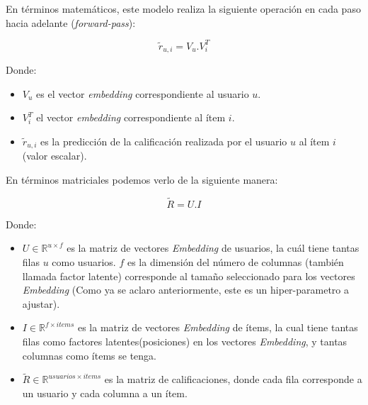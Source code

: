 \documentclass[11pt,a4paper,twoside]{thesis}
\begin{document}
\clearpage

En términos matemáticos, este modelo realiza la siguiente operación en cada
paso hacia adelante (\textit{forward-pass}):

\begin{equation}
	\tilde{r}_{u, i} = V_u . V_i^{T}
\end{equation}
\begin{description}
	\item[Donde:]
\end{description}
\begin{itemize}
	\item $V_u$ es el vector \textit{embedding} correspondiente al usuario $u$.
	\item $V_i^{T}$ el vector \textit{embedding} correspondiente al ítem $i$.
	\item $ \tilde{r}_{u, i}$ es la predicción de la calificación realizada por el usuario $u$ al ítem $i$ (valor escalar).
\end{itemize}

En términos matriciales podemos verlo de la siguiente manera:

\begin{equation}
	\tilde{R} = U.I
\end{equation}
\begin{description}
	\item[Donde:]
\end{description}
\begin{itemize}
	\item $U\in\mathbb{R}^{u \times f}$ es la matriz de vectores \textit{Embedding} de usuarios,
	      la cuál tiene tantas filas $u$ como usuarios. $f$ es la dimensión del número de columnas
	      (también llamada factor latente) corresponde al tamaño seleccionado para los vectores \textit{Embedding}
	      (Como ya se aclaro anteriormente, este es un hiper-parametro a ajustar).
	\item $I\in\mathbb{R}^{f\times items}$ es la matriz de vectores \textit{Embedding} de ítems,
	      la cual tiene tantas filas como factores latentes(posiciones) en los vectores \textit{Embedding}, y
	      tantas columnas como ítems se tenga.
	\item $\tilde{R}\in\mathbb{R}^{usuarios \times items}$ es la matriz de calificaciones,
	      donde cada fila corresponde a un usuario y cada columna a un ítem.
\end{itemize}
\end{document}
